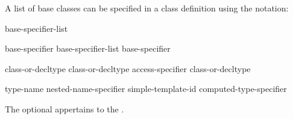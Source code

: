 \pnum
{}%
%
%
A list of base classes can be specified in a class definition using
the notation:

\begin{bnf}
\br
    \terminal{:} base-specifier-list
\end{bnf}


\begin{bnf}
\br
    base-specifier \br
    base-specifier-list \terminal{,} base-specifier 
\end{bnf}

\begin{bnf}
\br
     class-or-decltype\br
       class-or-decltype\br
     access-specifier  class-or-decltype
\end{bnf}

\begin{bnf}
\br
     type-name\br
    nested-name-specifier  simple-template-id\br
    computed-type-specifier
\end{bnf}

%
%
\begin{bnf}
\br
    \br
    \br
\end{bnf}

The optional  appertains to the .

